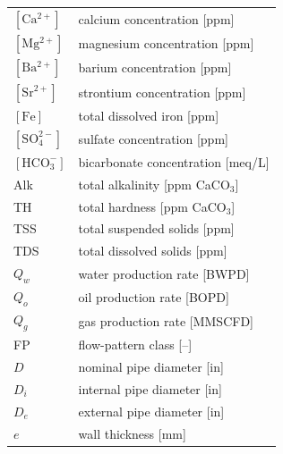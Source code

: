 \begin{table}[htb!]
\begin{tabularx}{0.45\textwidth}{@{}lX@{}}
$[\mathrm{Ca^{2+}}]$ & calcium concentration [ppm] \\%
$[\mathrm{Mg^{2+}}]$ & magnesium concentration [ppm] \\%
$[\mathrm{Ba^{2+}}]$ & barium concentration [ppm] \\%
$[\mathrm{Sr^{2+}}]$ & strontium concentration [ppm] \\%
$[\mathrm{Fe}]$ & total dissolved iron [ppm] \\%
$[\mathrm{SO_4^{2-}}]$ & sulfate concentration [ppm] \\%
$[\mathrm{HCO_3^-}]$ & bicarbonate concentration [meq/L] \\%
Alk & total alkalinity [ppm CaCO$_3$] \\%
TH & total hardness [ppm CaCO$_3$] \\%
TSS & total suspended solids [ppm] \\%
TDS & total dissolved solids [ppm] \\%
$Q_w$ & water production rate [BWPD] \\%
$Q_o$ & oil production rate [BOPD] \\%
$Q_g$ & gas production rate [MMSCFD] \\%
FP & flow-pattern class [--] \\%
$D$ & nominal pipe diameter [in] \\%
$D_i$ & internal pipe diameter [in] \\%
$D_e$ & external pipe diameter [in] \\%
$e$ & wall thickness [mm] \\%
\bottomrule
\end{tabularx}
\end{table}
